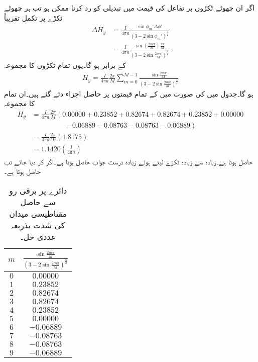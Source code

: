 اگر ان چھوٹے ٹکڑوں پر تفاعل کی قیمت میں تبدیلی کو رد کرنا ممکن ہو تب ہر چھوٹے ٹکڑے پر تکمل تقریباً
\begin{align*}
\Delta H_y&=\frac{I}{4\pi a} \frac{\sin \phi_m' \Delta \phi'}{\left(3-2\sin \phi_m'\right)^{\frac{3}{2}}} \\
&=\frac{I}{4\pi a} \frac{\sin (\frac{2 m \pi}{M}) \frac{2\pi}{M}}{\left(3-2\sin   \frac{2 m \pi}{M}\right)^{\frac{3}{2}}} 
\end{align*}
کے برابر ہو گا۔یوں تمام ٹکڑوں کا مجموعہ
\begin{align*}
H_y= \frac{I}{4\pi a} \frac{2\pi}{M} \sum_{m=0}^{M-1}\frac{\sin  \frac{2 m \pi}{M} }{\left(3-2\sin  \frac{2 m \pi}{M}\right)^{\frac{3}{2}}}
\end{align*}
ہو گا۔جدول  میں  کی صورت میں  کے تمام قیمتوں پر حاصل   اجزاء دئے گئے ہیں۔ان تمام کا مجموعہ
\begin{align*}
H_y&=\frac{I}{4\pi a} \frac{2\pi}{M} \left(0.00000+0.23852 +  0.82674 +  0.82674  + 0.23852  + 0.00000 \right.  \\
& \quad \quad \quad \quad \quad \left.-0.06889  -0.08763  -0.08763  -0.06889\right)\\
&=\frac{I}{4\pi a}\frac{2\pi}{10} (1.8175)\\
&=1.1420 \left(\frac{ I}{4\pi a}\right)
\end{align*}
حاصل ہوتا ہے۔زیادہ سے زیادہ ٹکڑے لیتے ہوئے زیادہ درست جواب حاصل ہوتا ہے۔اگر  کر دیا جائے تب   حاصل ہوتا ہے۔
\begin{table}
\centering
\begin{tabular}{c c}
$m$& $\frac{\sin  \frac{2 m \pi}{M}}{\left(3-2\sin  \frac{2 m \pi}{M}\right)^{\frac{3}{2}}}$\\[3ex]
\hline
$0$& $0.00000$\\
$1$& $0.23852$\\
$2$&$0.82674 $\\
$3$& $0.82674$\\
$4$& $0.23852$\\
$5$& $0.00000$\\
$6$& $-0.06889$\\
$7$&$-0.08763$\\
$8$& $ -0.08763$\\
$9$& $-0.06889$
\end{tabular}
\caption{دائرے پر برقی رو سے حاصل مقناطیسی میدان کی شدت بذریعہ عددی حل۔}
\label{جدول_مقناطیسی_دائرہ_مقناطیسی_شدت_عددی_حل}
\end{table}


